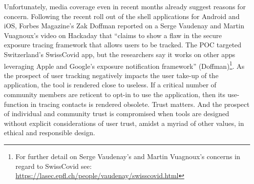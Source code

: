 \documentclass[11pt,dvipdfm]{article}
\begin{document}
Unfortunately, media coverage even in recent months already suggest reasons for concern.  Following the recent roll out of the shell applications for Android and iOS, Forbes Magazine’s Zak Doffman reported on a Serge Vaudenay and Martin Vuagnoux’s video on Hackaday that ``claims to show a flaw in the secure exposure tracing framework that allows users to be tracked.  The POC targeted Switzerland’s SwissCovid app, but the researchers say it works on other apps leveraging Apple and Google’s exposure notification framework'' (Doffman)\footnote{  For further detail on Serge Vaudenay’s and Martin Vuagnoux’s concerns in regard to SwissCovid see: \url{https://lasec.epfl.ch/people/vaudenay/swisscovid.html} }.  As the prospect of user tracking negatively impacts the user take-up of the application, the tool is rendered close to useless.  If a critical number of community members are reticent to opt-in to use the application, then its use-function in tracing contacts is rendered obsolete.  Trust matters.  And the prospect of individual and community trust is compromised when tools are designed without explicit considerations of user trust, amidst a myriad of other values, in ethical and responsible design. 
 
\end{document}
